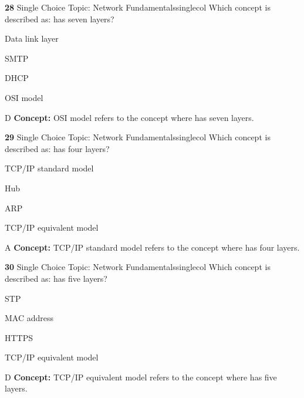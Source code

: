 \documentclass[10pt,a4paper]{article}
\begin{document}
\begin{qcard}{\color{white}\textbf{28} \hfill \small Single Choice \textbar{} Topic: Network Fundamentals}{singlecol}
Which concept is described as: has seven layers?

\begin{qoptions}
\item Data link layer
\item SMTP
\item DHCP
\item OSI model
\end{qoptions}
\begin{explainbox}{D}
\textbf{Concept:} OSI model refers to the concept where has seven layers.
\end{explainbox}
\end{qcard}

\begin{qcard}{\color{white}\textbf{29} \hfill \small Single Choice \textbar{} Topic: Network Fundamentals}{singlecol}
Which concept is described as: has four layers?

\begin{qoptions}
\item TCP/IP standard model
\item Hub
\item ARP
\item TCP/IP equivalent model
\end{qoptions}
\begin{explainbox}{A}
\textbf{Concept:} TCP/IP standard model refers to the concept where has four layers.
\end{explainbox}
\end{qcard}

\begin{qcard}{\color{white}\textbf{30} \hfill \small Single Choice \textbar{} Topic: Network Fundamentals}{singlecol}
Which concept is described as: has five layers?

\begin{qoptions}
\item STP
\item MAC address
\item HTTPS
\item TCP/IP equivalent model
\end{qoptions}
\begin{explainbox}{D}
\textbf{Concept:} TCP/IP equivalent model refers to the concept where has five layers.
\end{explainbox}
\end{qcard}
\end{document}
